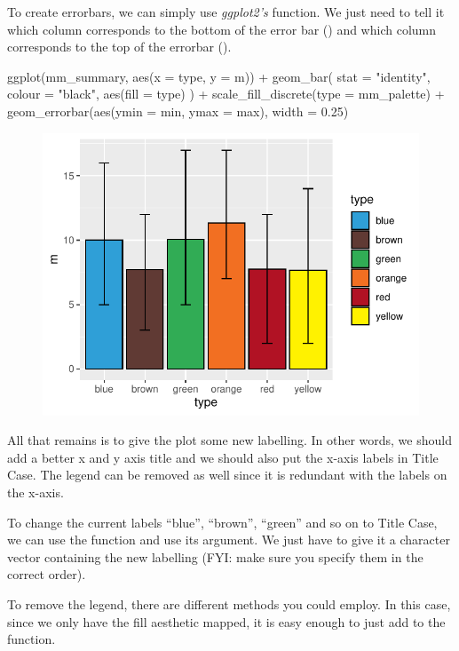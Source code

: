 To create errorbars, we can simply use \textit{ggplot2's}  function. We just need to tell it which column corresponds to the bottom of the error bar () and which column corresponds to the top of the errorbar ().

\begin{inR}
ggplot(mm_summary, aes(x = type, y = m)) +
  geom_bar(
    stat = "identity",
    colour = "black",
    aes(fill = type)
  ) +
  scale_fill_discrete(type = mm_palette) +
  geom_errorbar(aes(ymin = min, ymax = max), width = 0.25)
\end{inR}

\vspace{2em}

\begin{figure}[H]
\includegraphics[scale = .75]{graphics/ch3Figs/bar_3.pdf}
\end{figure}

All that remains is to give the plot some new labelling. In other words, we should add a better x and y axis title and we should also put the x-axis labels in Title Case. The legend can be removed as well since it is redundant with the labels on the x-axis.

To change the current labels ``blue'', ``brown'', ``green'' and so on to Title Case, we can use the function  and use its  argument. We just have to give it a character vector containing the new labelling (FYI: make sure you specify them in the correct order).

To remove the legend, there are different methods you could employ. In this case, since we only have the fill aesthetic mapped, it is easy enough to just add  to the  function.

